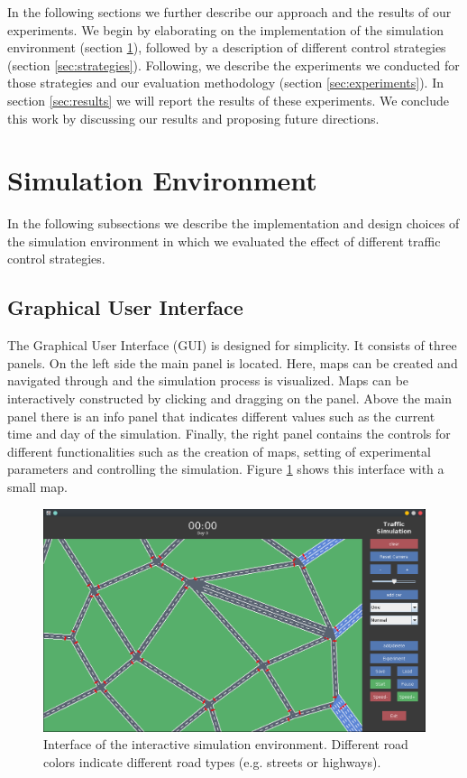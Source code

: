 \documentclass[10pt]{article}
\begin{document}
\vspace{20pt}

In the following sections we further describe our approach and the results of our experiments. We begin by elaborating on the implementation of the simulation environment (section \ref{sec:envi}), followed by a description of different control strategies (section \ref{sec:strategies}). Following, we describe the experiments we conducted for those strategies and our evaluation methodology (section \ref{sec:experiments}). In section \ref{sec:results} we will report the results of these experiments. We conclude this work by discussing our results and proposing future directions.
	
\section{Simulation Environment}
\label{sec:envi}
In the following subsections we describe the implementation and design choices of the simulation environment in which we evaluated the effect of different traffic control strategies.

\subsection{Graphical User Interface}
The Graphical User Interface (GUI) is designed for simplicity. It consists of three  panels. On the left side the main panel is located. Here, maps can be created and navigated through and the simulation process is visualized. Maps can be interactively constructed by clicking and dragging on the panel. Above the main panel there is an info panel that indicates different values such as the current time and day of the simulation. Finally, the right panel contains the controls for different functionalities such as the creation of maps, setting of experimental parameters and controlling the simulation. Figure \ref{fig:interface} shows this interface with a small map.

\begin{figure}
	\includegraphics[width=\linewidth]{img/interface.png}
	\caption{Interface of the interactive simulation environment. Different road colors indicate different road types (e.g. streets or highways). \label{fig:interface}}
\end{figure}
	
\end{document}
